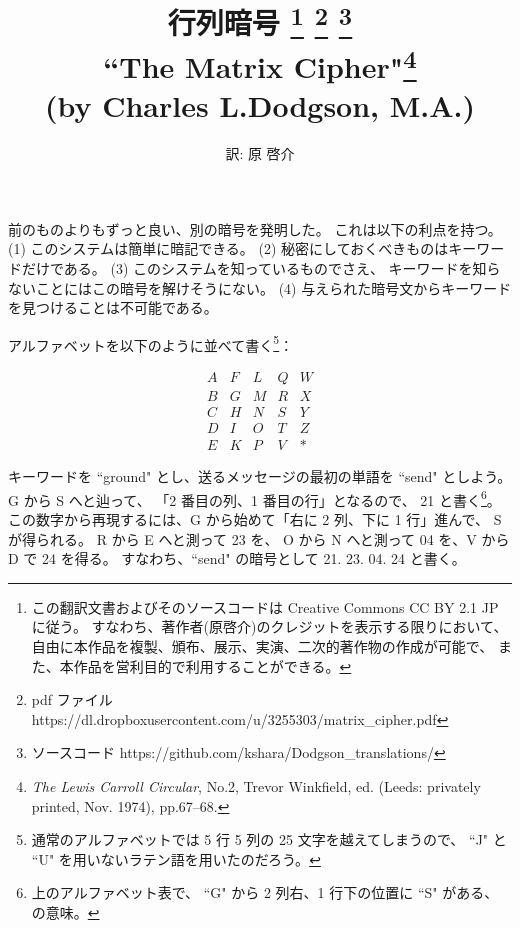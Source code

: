 \documentclass{article}
\title{行列暗号
    \footnote{この翻訳文書およびそのソースコードは
    Creative Commons CC BY 2.1 JP に従う。
    すなわち、著作者(原啓介)のクレジットを表示する限りにおいて、
    自由に本作品を複製、頒布、展示、実演、二次的著作物の作成が可能で、
    また、本作品を営利目的で利用することができる。}
    \footnote{pdf ファイル https://dl.dropboxusercontent.com/u/3255303/matrix\_cipher.pdf}
    \footnote{ソースコード https://github.com/kshara/Dodgson\_translations/}
    \\
    \smallskip
    {\large
        ``The Matrix Cipher"\footnote{
            {\it The Lewis Carroll Circular}, No.2,
            Trevor Winkfield, ed. (Leeds: privately printed, Nov. 1974),
            pp.67--68.}
     \\
    (by Charles L.Dodgson, M.A.)
    }
}
\author{訳: 原 啓介}
\begin{document}
\maketitle



\section*{}

前のものよりもずっと良い、別の暗号を発明した。
これは以下の利点を持つ。
(1) このシステムは簡単に暗記できる。
(2) 秘密にしておくべきものはキーワードだけである。
(3) このシステムを知っているものでさえ、
キーワードを知らないことにはこの暗号を解けそうにない。
(4) 与えられた暗号文からキーワードを見つけることは不可能である。

アルファベットを以下のように並べて書く\footnote{通常のアルファベットでは
5 行 5 列の 25 文字を越えてしまうので、
``J" と ``U" を用いないラテン語を用いたのだろう。}：

\[
\begin{array}{ccccc}
    A & F & L & Q & W\\
    B & G & M & R & X\\
    C & H & N & S & Y\\
    D & I & O & T & Z\\
    E & K & P & V & \ast
\end{array}
\]

キーワードを ``ground" とし、送るメッセージの最初の単語を ``send" としよう。
G から S へと辿って、
「2 番目の列、1 番目の行」となるので、
21 と書く\footnote{上のアルファベット表で、
``G" から 2 列右、1 行下の位置に ``S" がある、の意味。}。
この数字から再現するには、G から始めて「右に 2 列、下に 1 行」進んで、
S が得られる。
R から E へと測って 23 を、
O から N へと測って 04 を、V から D で 24 を得る。
すなわち、``send" の暗号として 21. 23. 04. 24 と書く。
\end{document}

